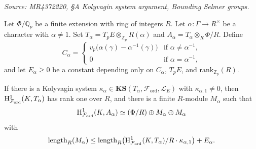 \begin{theorem}
  \label{thm:Zp-twisted}
  \textit{Source: MR4372220, §A Kolyvagin system argument, Bounding Selmer groups.}

  Let \(\Phi/\mathbb{Q}_p\) be a finite extension with ring of integers \(R\). Let \(\alpha : \Gamma \to R^\times\) be a character with \(\alpha \neq 1\). Set \(T_\alpha = T_p E \otimes_{\mathbb{Z}_p} R(\alpha)\) and \(A_\alpha = T_\alpha \otimes_R \Phi/R\). Define
  \[
    C_\alpha =
    \begin{cases}
      v_p\!\bigl(\alpha(\gamma) - \alpha^{-1}(\gamma)\bigr) & \text{if } \alpha \neq \alpha^{-1}, \\
      0 & \text{if } \alpha = \alpha^{-1},
    \end{cases}
  \]
  and let \(E_\alpha \geq 0\) be a constant depending only on \(C_\alpha\), \(T_p E\), and \(\mathrm{rank}_{\mathbb{Z}_p}(R)\).

  If there is a Kolyvagin system \(\kappa_\alpha \in \mathbf{KS}(T_\alpha, \mathcal{F}_{\mathrm{ord}}, \mathcal{L}_E)\) with \(\kappa_{\alpha,1} \neq 0\), then \(\mathrm{H}^1_{\mathcal{F}_{\mathrm{ord}}}(K, T_\alpha)\) has rank one over \(R\), and there is a finite \(R\)-module \(M_\alpha\) such that
  \[
    \mathrm{H}^1_{\mathcal{F}_{\mathrm{ord}}}(K, A_\alpha) \simeq (\Phi/R) \oplus M_\alpha \oplus M_\alpha
  \]
  with
  \[
    \mathrm{length}_R(M_\alpha) \leq \mathrm{length}_R\!\left(\mathrm{H}^1_{\mathcal{F}_{\mathrm{ord}}}(K, T_\alpha) / R \cdot \kappa_{\alpha,1}\right) + E_\alpha.
  \]
\end{theorem}

